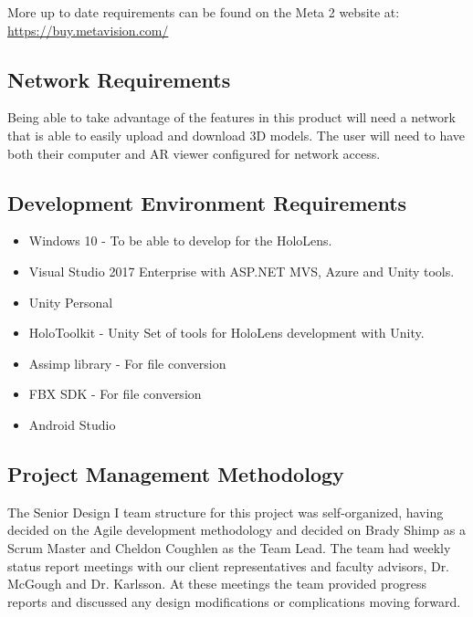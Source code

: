 More up to date requirements can be found on the Meta 2 website at: 
\url{https://buy.metavision.com/}

\subsection{Network Requirements}

Being able to take advantage of the features in this product will need a network
that is able to easily upload and download 3D models. The user will need to have
both their computer and AR viewer configured for network access.

\subsection{Development Environment Requirements}
\begin{itemize}
	\item Windows 10 - To be able to develop for the HoloLens.
	\item Visual Studio 2017 Enterprise with ASP.NET MVS, Azure and Unity tools.
	\item Unity Personal
	\item HoloToolkit - Unity Set of tools for HoloLens development with Unity.
	\item Assimp library - For file conversion
	\item FBX SDK - For file conversion
	\item Android Studio
\end{itemize}


\subsection{Project Management Methodology}

The Senior Design I team structure for this project was self-organized, having decided on the Agile development methodology and decided on Brady Shimp as a Scrum Master and Cheldon Coughlen as the Team Lead. The team had weekly status report meetings with our client representatives and faculty advisors, Dr. McGough and Dr. Karlsson. At these meetings the team provided progress reports and discussed any design modifications or complications moving forward.\\

